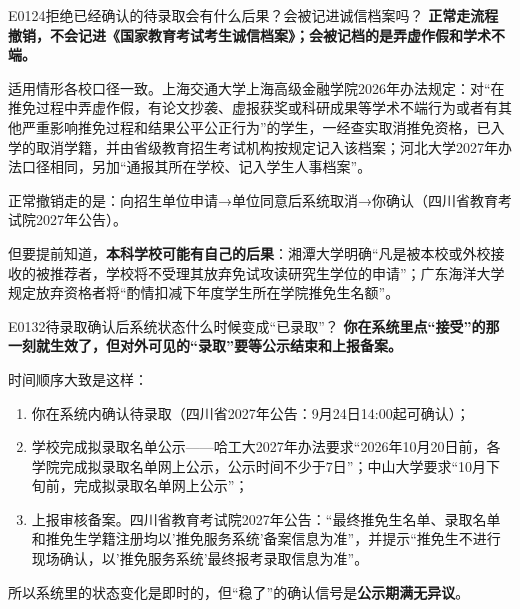 \begin{qa}{E0124}{拒绝已经确认的待录取会有什么后果？会被记进诚信档案吗？}
\textbf{正常走流程撤销，不会记进《国家教育考试考生诚信档案》；会被记档的是弄虚作假和学术不端。}

适用情形各校口径一致。上海交通大学上海高级金融学院2026年办法规定：对“在推免过程中弄虚作假，有论文抄袭、虚报获奖或科研成果等学术不端行为或者有其他严重影响推免过程和结果公平公正行为”的学生，一经查实取消推免资格，已入学的取消学籍，并由省级教育招生考试机构按规定记入该档案；河北大学2027年办法口径相同，另加“通报其所在学校、记入学生人事档案”。

正常撤销走的是：向招生单位申请→单位同意后系统取消→你确认（四川省教育考试院2027年公告）。

但要提前知道，\textbf{本科学校可能有自己的后果}：湘潭大学明确“凡是被本校或外校接收的被推荐者，学校将不受理其放弃免试攻读研究生学位的申请”；广东海洋大学规定放弃资格者将“酌情扣减下年度学生所在学院推免生名额”。
\end{qa}

\begin{qa}{E0132}{待录取确认后系统状态什么时候变成“已录取”？}
\textbf{你在系统里点“接受”的那一刻就生效了，但对外可见的“录取”要等公示结束和上报备案。}

时间顺序大致是这样：

\begin{enumerate}
  \item 你在系统内确认待录取（四川省2027年公告：9月24日14:00起可确认）；
  \item 学校完成拟录取名单公示——哈工大2027年办法要求“2026年10月20日前，各学院完成拟录取名单网上公示，公示时间不少于7日”；中山大学要求“10月下旬前，完成拟录取名单网上公示”；
  \item 上报审核备案。四川省教育考试院2027年公告：“最终推免生名单、录取名单和推免生学籍注册均以'推免服务系统'备案信息为准”，并提示“推免生不进行现场确认，以'推免服务系统'最终报考录取信息为准”。
\end{enumerate}

所以系统里的状态变化是即时的，但“稳了”的确认信号是\textbf{公示期满无异议}。
\end{qa}


